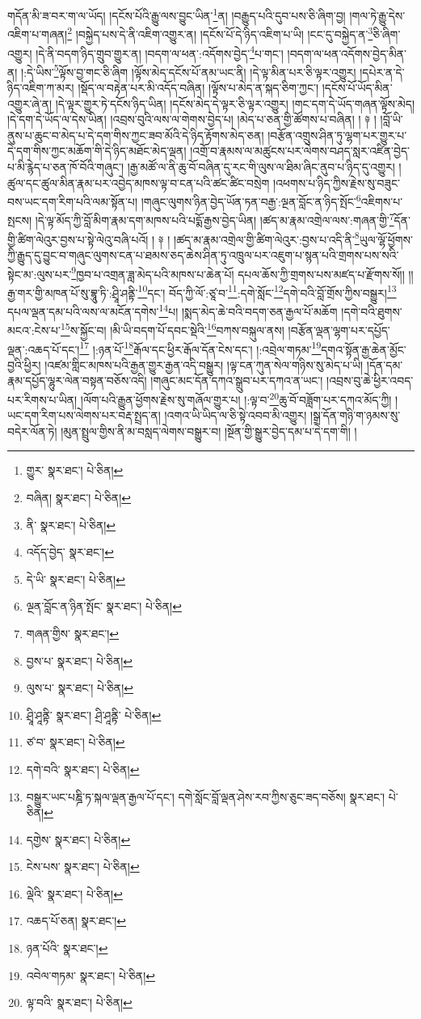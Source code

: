 གདོན་མི་ཟ་བར་ག་ལ་ཡོད། །དངོས་པོའི་རྒྱུ་ལས་བྱུང་ཡིན་\footnote{གྱུར་  སྣར་ཐང་།  པེ་ཅིན། }ན། །བརྒྱུད་པའི་དུབ་པས་ཅི་ཞིག་བྱ། །གལ་ཏེ་རྒྱུ་དེས་འཇིག་པ་གཞན།\footnote{བཞིན།  སྣར་ཐང་།  པེ་ཅིན། } །བསྐྱེད་པས་དེ་ནི་འཇིག་འགྱུར་ན། །དངོས་པོ་དེ་ཉིད་འཇིག་པ་ཡི། །ངང་དུ་བསྐྱེད་ན་\footnote{ནི་  སྣར་ཐང་།  པེ་ཅིན། }ཅི་ཞིག་འགྱུར། །དེ་ནི་བདག་ཉིད་གྲུབ་གྱུར་ན། །བདག་ལ་ཕན་:འདོགས་བྱེད་\footnote{འདོད་བྱེད་  སྣར་ཐང་། }པ་གང་། །བདག་ལ་ཕན་འདོགས་བྱེད་མིན་ན། །:དེ་ཡིས་\footnote{དེ་ཡི་  སྣར་ཐང་།  པེ་ཅིན། }ལྟོས་བྱ་གང་ཅི་ཞིག །ལྟོས་མེད་དངོས་པོ་ནམ་ཡང་ནི། །དེ་ལྟ་མིན་པར་ཅི་ལྟར་འགྱུར། །དཔེར་ན་དེ་ཉིད་འཇིག་ཀ་མར། །སྡོད་ལ་བརྟེན་པར་མི་འདོད་བཞིན། །ལྟོས་པ་མེད་ན་སྐད་ཅིག་ཀྱང་། །དངོས་པོ་ཡོད་མིན་འགྱུར་ཞེ་ན། །དེ་ལྟར་གྱུར་ཏེ་དངོས་ཉིད་ཡིན། །དངོས་མེད་དེ་ལྟར་ཅི་ལྟར་འགྱུར། །གང་དག་དེ་ཡོད་གཞན་ལྟོས་མེད། །དེ་དག་དེ་ཡོད་ལ་དེས་ཡིན། །འབྲས་བུའི་ལས་ལ་གེགས་བྱེད་པ། །མེད་པ་ཅན་གྱི་ཚོགས་པ་བཞིན། ། ༈ ། །བློ་ཡི་ནུས་པ་ཆུང་བ་མེད་པ་དེ་དག་གིས་ཀྱང་ཟབ་མོའི་དེ་ཉིད་རྟོགས་མེད་ཅན། །བརྩོན་འགྲུས་ཤིན་ཏུ་ལྷག་པར་གྱུར་པ་དེ་དག་གིས་ཀྱང་མཆོག་གི་དེ་ཉིད་མཐོང་མེད་ལྡན། །འགྲོ་བ་རྣམས་ལ་མཚུངས་པར་ལེགས་བཤད་སླར་འཛིན་བྱེད་པ་མི་རྙེད་པ་ཅན་ཁོ་བོའི་གཞུང་། །རྒྱ་མཚོ་ལ་ནི་ཆུ་བོ་བཞིན་དུ་རང་གི་ལུས་ལ་ཐིམ་ཞིང་ནུབ་པ་ཉིད་དུ་འགྱུར། །ཚུལ་དང་ཚུལ་མིན་རྣམ་པར་འབྱེད་མཁས་ལྟ་བ་ངན་པའི་ཚང་ཚིང་བསྲེག །འཕགས་པ་ཉིད་ཀྱིས་རྗེས་སུ་བཟུང་བས་ཡང་དག་རིག་པའི་ལམ་སྟོན་པ། །གཞུང་ལུགས་ཉིན་བྱེད་ཡོན་ཏན་བརྒྱ་:ལྔན་བློང་ན་ཉིད་སྤོང་\footnote{ལྔན་བློང་ན་ཉིན་སྤོང་  སྣར་ཐང་།  པེ་ཅིན། }འཇིགས་པ་སྤངས། །དེ་ལྟ་མོད་ཀྱི་བློ་མིག་རྣམ་དག་མཁས་པའི་པདྨོ་རྒྱས་བྱེད་ཡིན། །ཚད་མ་རྣམ་འགྲེལ་ལས་:གཞན་གྱི་\footnote{གཞན་གྱིས་  སྣར་ཐང་། }དོན་གྱི་ཚིག་ལེའུར་བྱས་པ་སྟེ་ལེའུ་བཞི་པའོ། ། ༈ ། །ཚད་མ་རྣམ་འགྲེལ་གྱི་ཚིག་ལེའུར་:བྱས་པ་འདི་ནི་\footnote{བྱས་པ་  སྣར་ཐང་།  པེ་ཅིན། }ཡུལ་ལྷོ་ཕྱོགས་ཀྱི་རྒྱུད་དུ་བྱུང་བ་གཞུང་ལུགས་ངན་པ་ཐམས་ཅད་ཆེས་ཤིན་ཏུ་འཁྲུལ་པར་འཇུག་པ་སྙན་པའི་གྲགས་པས་སའི་སྟེང་མ་:ལུས་པར་\footnote{ལུས་པ་  སྣར་ཐང་།  པེ་ཅིན། }ཁྱབ་པ་འགྲན་ཟླ་མེད་པའི་མཁས་པ་ཆེན་པོ། དཔལ་ཆོས་ཀྱི་གྲགས་པས་མཛད་པ་རྫོགས་སོ།། །།རྒྱ་གར་གྱི་མཁན་པོ་སུ་བྷཱུ་ཏི་:ཤྲཱི་ཤནྟི་\footnote{ཤྲཱི་ཤཱནྟི་  སྣར་ཐང་། ཤྲི་ཤཱནྟི་  པེ་ཅིན། }དང་། བོད་ཀྱི་ལོ་:ཙཱ་བ་\footnote{ཙ་བ་  སྣར་ཐང་།  པེ་ཅིན། }:དགེ་སློང་\footnote{དགེ་བའི་  སྣར་ཐང་།  པེ་ཅིན། }དགེ་བའི་བློ་གྲོས་ཀྱིས་བསྒྱུར།\footnote{བསྒྱུར་ཡང་པཎྜི་ཏ་སྐལ་ལྡན་རྒྱལ་པོ་དང་། དགེ་སློང་བློ་ལྡན་ཤེས་རབ་ཀྱིས་ཅུང་ཟད་བཅོས།  སྣར་ཐང་།  པེ་ཅིན། } དཔལ་ལྡན་དམ་པའི་ལས་ལ་མངོན་དགེས་\footnote{དགྱེས་  སྣར་ཐང་།  པེ་ཅིན། }པ། །སྨད་མེད་ཆེ་བའི་བདག་ཅན་རྒྱལ་པོ་མཆོག །དགེ་བའི་ཐུགས་མངའ་:ངེས་པ་\footnote{ངེས་པས་  སྣར་ཐང་།  པེ་ཅིན། }ས་སྐྱོང་བ། །མི་ཡི་བདག་པོ་དབང་སྡེའི་\footnote{ལྡེའི་  སྣར་ཐང་།  པེ་ཅིན། }བཀས་བསྐུལ་ནས། །བརྩོན་ལྡན་ལྷག་པར་དཔྱོད་ལྡན་:འཆད་པོ་དང་།\footnote{འཆད་པོ་ཅན།  སྣར་ཐང་། } །:ཉན་པོ་\footnote{ཉན་པོའི་  སྣར་ཐང་། }རྒོལ་དང་ཕྱིར་རྒོལ་དོན་ངེས་དང་། །:འབྲེལ་གཏམ་\footnote{འབེལ་གཏམ་  སྣར་ཐང་།  པེ་ཅིན། }དགའ་སྟོན་རྒྱ་ཆེན་མྱོང་བྱའི་ཕྱིར། །འཛམ་གླིང་མཁས་པའི་རྒྱན་གྱུར་རྒྱན་འདི་བསྒྱུར། །ལྟ་ངན་ཀུན་སེལ་གཉིས་སུ་མེད་པ་ཡི། །དོན་དམ་རྣམ་དཔྱོད་ལྷུར་ལེན་བསྟན་བཅོས་འདི། །གཞུང་མང་དོན་དཀའ་སྒྲུབ་པར་དཀའ་ན་ཡང་། །འབྲས་བུ་ཆེ་ཕྱིར་འབད་པར་རིགས་པ་ཡིན། །ལོག་པའི་རྒྱུན་ཕྱོགས་རྗེས་སུ་གཞོལ་གྱུར་པ། །:ལྟ་བ་\footnote{ལྟ་བའི་  སྣར་ཐང་།  པེ་ཅིན། }ཆུ་བོ་བཟློག་པར་དཀའ་མོད་ཀྱི། །ཡང་དག་རིག་པས་ལེགས་པར་བརྡ་སྤྲད་ན། །འགའ་ཡི་ཡིད་ལ་ཅི་སྟེ་འབབ་མི་འགྱུར། །སྒྲ་དོན་གཉི་ག་ཉམས་སུ་བདེར་ལོན་ཏེ། །མུན་སྤྲུལ་གྱིས་ནི་མ་བསླད་ལེགས་བསྒྱུར་བ། །སྔོན་གྱི་སྒྱུར་བྱེད་དམ་པ་དེ་དག་གི། །
